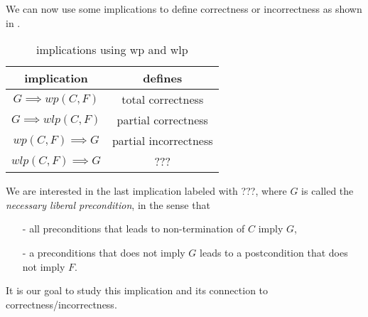 \documentclass[adraft,hidelinks]{eptcs}
\begin{document}
We can now use some implications to define correctness or incorrectness as shown in . 
\begin{table}\centering 
    \begin{tabular}{cc}
      \textbf{implication}&\textbf{defines}    \\ \hline
      $G\implies wp(C,F)$&   total correctness   \\
      $G\implies wlp(C,F)$&  partial correctness\\
      $wp(C,F)\implies G$&  partial incorrectness\\
      $wlp(C,F)\implies G$&  ???\\
    \end{tabular}
    \caption{implications using wp and wlp\cite{Zhang2022}}
    \label{tab:impl}
\end{table}

We are interested in the last implication labeled with ???, where $G$ is called the \textit{necessary liberal precondition}, in the sense that 
\begin{itemize}
    \item [-] all preconditions that leads to non-termination of $C$ imply $G$, 
    \item [-] a preconditions that does not imply $G$ leads to a postcondition that does not imply $F$. 
\end{itemize}
It is our goal to study this implication and its connection to correctness/incorrectness. 

\begin{comment}
\todo[inline, color=pink]{This is where I disagree with the statements in \cite{Zhang2022} top of page 21 : 
``\textit{??? gives rise to a notion of necessary liberal preconditions, in the sense that (1) $G$ contains all initial states $\sigma$ that diverge, and (2) whenever $\sigma\nvDash G$, then $\sigma$ is guaranteed to terminate in a state $\tau \nvDash F$. }''. 
Specifically number (2). Recall definition (using notation in the paper) 
\[\sigma\vDash wlp\bkt{C}(\psi)\text{ iff }\forall\tau\in\bkt{C}(\sigma):\tau\vDash\psi\] 
and $$???\equiv \neg G \implies \neg wlp\bkt{C}(F)$$. 
$$\equiv\neg G \implies\neg(\forall\tau\in\bkt{C}(F):\tau\vDash F)\equiv \neg G \implies\exists\tau\in\bkt{C}(F):\tau\nvDash F$$
From $\neg G$ we can only infer that one of the calculations starting from $\tau$ ends up satisfying $\neg F$. 
And we can assume that the demonic choice would deliver an undsirable result when possible (we desire F or non-termination, but $\neg G$ rules out non-termination), 
then we \textit{should} end up with $\neg F$. 
But it seems to me like loosing non-determinism. For example, 
$$wlp\bkt C (F):= wlp\bkt{x:=x * 2 \square x := x*3} (x\mid 6) $$$$= wlp\bkt{x:=x * 2} (x\mid 6) \wedge wlp\bkt{x := x*3} (x\mid 6) 
$$$$= x\mid 3 \wedge x\mid 2 =: G$$
then with $\sigma(x):=2$ we have $\sigma\nvDash G$. 
But starting from $\sigma$, we can not guarantee final states satisfying $F$, otherwise I think we would lose the nondeterminism. 
If this is true, where does it leave us? What does ??? then tell us? 
}
\end{comment}
\end{document}
